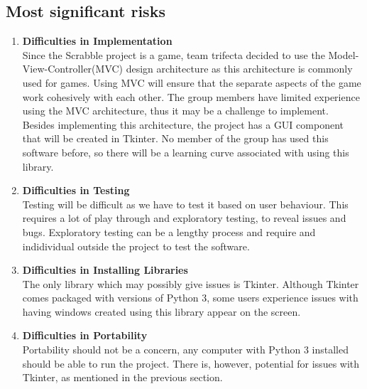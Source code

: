 \documentclass{article}
\begin{document}
\subsection{Most significant risks}
\begin{enumerate}
\item \textbf{Difficulties in Implementation}\\
Since the Scrabble project is a game, team trifecta decided to use the Model-View-Controller(MVC) design architecture as this architecture is commonly used for games. Using MVC will ensure that the separate aspects of the game work cohesively with each other. The group members have limited experience using the MVC architecture, thus it may be a challenge to implement. Besides implementing this architecture, the project has a GUI component that will be created in Tkinter. No member of the group has used this software before, so there will be a learning curve associated with using this library. \\

\item \textbf{Difficulties in Testing}\\
Testing will be difficult as we have to test it based on user behaviour. This requires a lot of play through and exploratory testing, to reveal issues and bugs. Exploratory testing can be a lengthy process and require and indidividual outside the project to test the software.

\item \textbf{Difficulties in Installing Libraries}\\
The only library which may possibly give issues is Tkinter. Although Tkinter comes packaged with versions of Python 3, some users experience issues with having windows created using this library appear on the screen.

\item \textbf{Difficulties in Portability}\\
Portability should not be a concern, any computer with Python 3 installed should be able to run the project. There is, however, potential for issues with Tkinter, as mentioned in the previous section. 
\end{enumerate}
\end{document}
